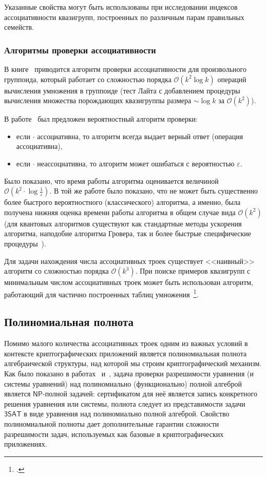     Указанные свойства могут быть использованы при исследовании индексов ассоциативности квазигрупп, построенных по различным парам правильных семейств.

\subsubsection{Алгоритмы проверки ассоциативности}

    В книге~\cite[раздел~1.2]{clifford61} приводится алгоритм проверки ассоциативности для произвольного группоида, который работает со сложностью порядка $\mathcal{O}(k^2 \log k)$ операций вычисления умножения в группоиде (тест Лайта с добавлением процедуры вычисления множества порождающих квазигруппы размера $\sim \log k$ за $\mathcal{O}(k^2)$).

    В работе~\cite{rajagopalan2000verification} был предложен вероятностный алгоритм проверки: 
    \begin{itemize}
        \item если $\cdot$ ассоциативна, то алгоритм всегда выдает верный ответ (операция ассоциативна), 
        \item если $\cdot$ неассоциативна, то алгоритм может ошибаться с вероятностью $\varepsilon$.
    \end{itemize}
    Было показано, что время работы алгоритма оценивается величиной $\mathcal{O}(k^2 \cdot \log \frac{1}{\varepsilon})$. 
    В той же работе было показано, что не может быть существенно более быстрого вероятностного (классического) алгоритма, а именно, была получена нижняя оценка времени работы алгоритма в общем случае вида $\mathcal{O}(k^2)$ (для квантовых алгоритмов существуют как стандартные методы ускорения алгоритма, наподобие алгоритма Гровера, так и более быстрые специфические процедуры~\cite{childs2010quantum}).

    Для задачи нахождения числа ассоциативных троек существует <<наивный>> алгоритм со сложностью порядка $\mathcal{O}(k^3)$.
    При поиске примеров квазигрупп с минимальным числом ассоциативных троек может быть использован алгоритм, работающий для частично построенных таблиц умножения~\footcite{valent2018small}.


\subsection{Полиномиальная полнота}

    Помимо малого количества ассоциативных троек одним из важных условий в контексте криптографических приложений является полиномиальная полнота алгебраической структуры, над которой мы строим криптографический механизм.
    Как было показано в работах~\cite{nipkow1990unification} и~\cite{horvath2008}, задача проверки разрешимости уравнения (и системы уравнений) над полиномиально (функционально) полной алгеброй является $\mathsf{NP}$-полной задачей: сертификатом для неё является запись конкретного решения уравнения или системы, полнота следует из представимости задачи $\mathsf{3SAT}$ в виде уравнения над полиномиально полной алгеброй.
    Свойство полиномиальной полноты дает дополнительные гарантии сложности разрешимости задач, используемых как базовые в криптографических приложениях.

